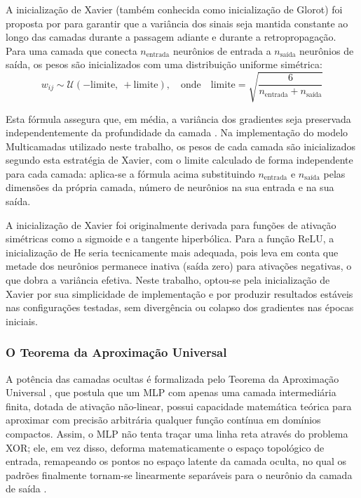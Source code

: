 A inicialização de Xavier (também conhecida como inicialização de Glorot) foi proposta por  para garantir que a variância dos sinais seja mantida constante ao longo das camadas durante a passagem adiante e durante a retropropagação. Para uma camada que conecta $n_{\text{entrada}}$ neurônios de entrada a $n_{\text{saída}}$ neurônios de saída, os pesos são inicializados com uma distribuição uniforme simétrica:
\begin{equation}
w_{ij} \sim \mathcal{U}\left(-\text{limite},\ +\text{limite}\right), \quad \text{onde} \quad \text{limite} = \sqrt{\frac{6}{n_{\text{entrada}} + n_{\text{saída}}}}
\end{equation}

Esta fórmula assegura que, em média, a variância dos gradientes seja preservada independentemente da profundidade da camada \cite{dsa2022}. Na implementação do modelo Multicamadas utilizado neste trabalho, os pesos de cada camada são inicializados segundo esta estratégia de Xavier, com o limite calculado de forma independente para cada camada: aplica-se a fórmula acima substituindo $n_{\text{entrada}}$ e $n_{\text{saída}}$ pelas dimensões da própria camada, número de neurônios na sua entrada e na sua saída.

A inicialização de Xavier foi originalmente derivada para funções de ativação simétricas como a sigmoide e a tangente hiperbólica. Para a função ReLU, a inicialização de He seria tecnicamente mais adequada, pois leva em conta que metade dos neurônios permanece inativa (saída zero) para ativações negativas, o que dobra a variância efetiva. Neste trabalho, optou-se pela inicialização de Xavier por sua simplicidade de implementação e por produzir resultados estáveis nas configurações testadas, sem divergência ou colapso dos gradientes nas épocas iniciais.

\subsubsection{O Teorema da Aproximação Universal}

A potência das camadas ocultas é formalizada pelo Teorema da Aproximação Universal \cite{cybenko1989,hornik1991,braga2007}, que postula que um MLP com apenas uma camada intermediária finita, dotada de ativação não-linear, possui capacidade matemática teórica para aproximar com precisão arbitrária qualquer função contínua em domínios compactos. Assim, o MLP não tenta traçar uma linha reta através do problema XOR; ele, em vez disso, deforma matematicamente o espaço topológico de entrada, remapeando os pontos no espaço latente da camada oculta, no qual os padrões finalmente tornam-se linearmente separáveis para o neurônio da camada de saída \cite{dsa2022}.


